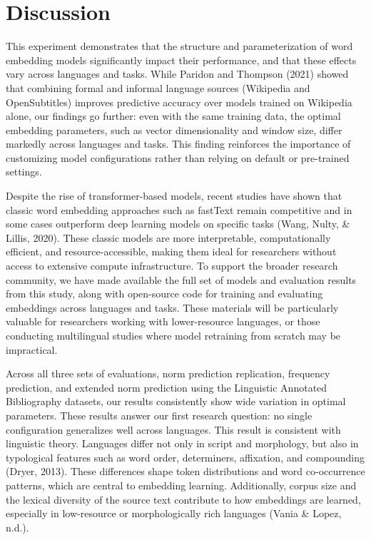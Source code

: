 \documentclass[
  man]{apa6}
\begin{document}
\section{Discussion}\label{discussion}

This experiment demonstrates that the structure and parameterization of word embedding models significantly impact their performance, and that these effects vary across languages and tasks. While Paridon and Thompson (2021) showed that combining formal and informal language sources (Wikipedia and OpenSubtitles) improves predictive accuracy over models trained on Wikipedia alone, our findings go further: even with the same training data, the optimal embedding parameters, such as vector dimensionality and window size, differ markedly across languages and tasks. This finding reinforces the importance of customizing model configurations rather than relying on default or pre-trained settings.

Despite the rise of transformer-based models, recent studies have shown that classic word embedding approaches such as fastText remain competitive and in some cases outperform deep learning models on specific tasks (Wang, Nulty, \& Lillis, 2020). These classic models are more interpretable, computationally efficient, and resource-accessible, making them ideal for researchers without access to extensive compute infrastructure. To support the broader research community, we have made available the full set of models and evaluation results from this study, along with open-source code for training and evaluating embeddings across languages and tasks. These materials will be particularly valuable for researchers working with lower-resource languages, or those conducting multilingual studies where model retraining from scratch may be impractical.

Across all three sets of evaluations, norm prediction replication, frequency prediction, and extended norm prediction using the Linguistic Annotated Bibliography datasets, our results consistently show wide variation in optimal parameters. These results answer our first research question: no single configuration generalizes well across languages. This result is consistent with linguistic theory. Languages differ not only in script and morphology, but also in typological features such as word order, determiners, affixation, and compounding (Dryer, 2013). These differences shape token distributions and word co-occurrence patterns, which are central to embedding learning. Additionally, corpus size and the lexical diversity of the source text contribute to how embeddings are learned, especially in low-resource or morphologically rich languages (Vania \& Lopez, n.d.).
\end{document}
